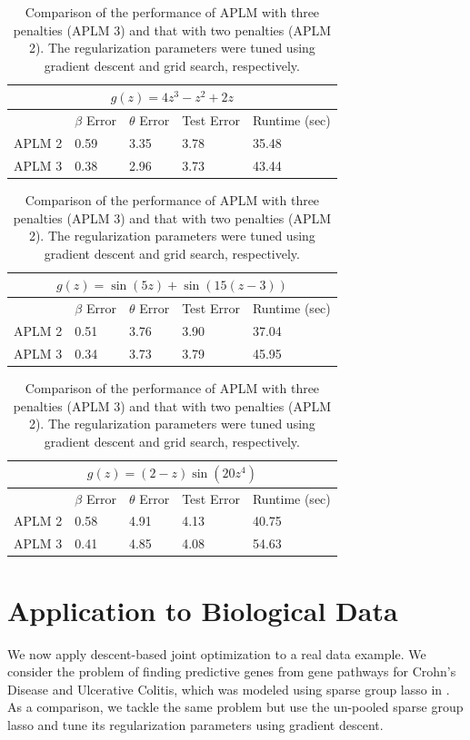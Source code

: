 \documentclass[12pt,letterpaper]{article}
\begin{document}
\begin{table}
\begin{center}
\begin{tabular}{| l | l | l | l | l | }
\hline
\multicolumn{5}{|c|}{$g(z) = 4z^3 - z^2 + 2z$}\\
\hline
 & $\beta$ Error & $\theta$ Error & Test Error & Runtime (sec) \\
\hline
APLM 2 & 0.59 & 3.35 & 3.78 & 35.48 \\
\hline
APLM 3 & 0.38 & 2.96 & 3.73 & 43.44 \\
\hline
\end{tabular}

\begin{tabular}{| l | l | l | l | l | }
\hline
\multicolumn{5}{|c|}{$g(z) = \sin(5z) + \sin(15(z - 3))$}\\
\hline
 & $\beta$ Error & $\theta$ Error & Test Error & Runtime (sec) \\
\hline
APLM 2 & 0.51 & 3.76 & 3.90 & 37.04 \\
\hline
APLM 3 & 0.34 & 3.73 & 3.79 & 45.95 \\
\hline
\end{tabular}

\begin{tabular}{| l | l | l | l | l | }
\hline
\multicolumn{5}{|c|}{$g(z) = (2-z)\sin(20z^4)$}\\
\hline
 & $\beta$ Error & $\theta$ Error & Test Error & Runtime (sec) \\
\hline
APLM 2 & 0.58 & 4.91 & 4.13 & 40.75 \\
\hline
APLM 3 & 0.41 & 4.85 & 4.08 & 54.63 \\
\hline
\end{tabular}
\end{center}
\caption {Comparison of the performance of APLM with three penalties (APLM 3) and that with two penalties (APLM 2). The regularization parameters were tuned using gradient descent and grid search, respectively.}
\label{ref:aplm}
\end{table}

\section{Application to Biological Data}\label{realDataResults}
We now apply descent-based joint optimization to a real data example. We consider the problem of finding predictive genes from gene pathways for Crohn's Disease and Ulcerative Colitis, which was modeled using sparse group lasso in \citet{simon2013sparse}. As a comparison, we tackle the same problem but use the un-pooled sparse group lasso and tune its regularization parameters using gradient descent.
\end{document}
